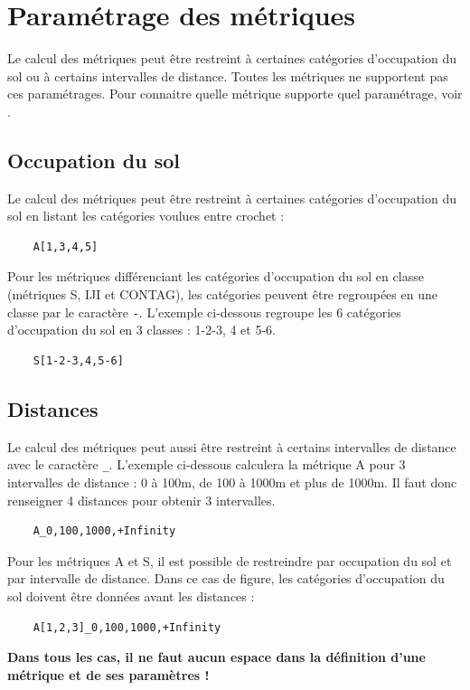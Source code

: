 \documentclass{report}
\begin{document}
\section{Paramétrage des métriques}
\label{param_metrics_cli}
Le calcul des métriques peut être restreint à certaines catégories d'occupation du sol ou à certains intervalles de distance. Toutes les métriques ne supportent pas ces paramétrages. Pour connaitre quelle métrique supporte quel paramétrage, voir .

\subsection{Occupation du sol}
Le calcul des métriques peut être restreint à certaines catégories d'occupation du sol en listant les catégories voulues entre crochet :
\begin{Verbatim}
	A[1,3,4,5]
\end{Verbatim}

Pour les métriques différenciant les catégories d'occupation du sol en classe (métriques S, IJI et CONTAG), les catégories peuvent être regroupées en une classe par le caractère \verb|-|. L'exemple ci-dessous regroupe les 6 catégories d'occupation du sol en 3 classes : 1-2-3, 4 et 5-6.
\begin{Verbatim}
	S[1-2-3,4,5-6]
\end{Verbatim}

\subsection{Distances}
Le calcul des métriques peut aussi être restreint à certains intervalles de distance avec le caractère \verb|_|. L'exemple ci-dessous calculera la métrique A pour 3 intervalles de distance : 0 à 100m, de 100 à 1000m et plus de 1000m. Il faut donc renseigner 4 distances pour obtenir 3 intervalles.
\begin{Verbatim}
	A_0,100,1000,+Infinity
\end{Verbatim}

Pour les métriques A et S, il est possible de restreindre par occupation du sol et par intervalle de distance. Dans ce cas de figure, les catégories d'occupation du sol doivent être données avant les distances :
\begin{Verbatim}
	A[1,2,3]_0,100,1000,+Infinity
\end{Verbatim}

\textbf{Dans tous les cas, il ne faut aucun espace dans la définition d'une métrique et de ses paramètres !}
\end{document}
